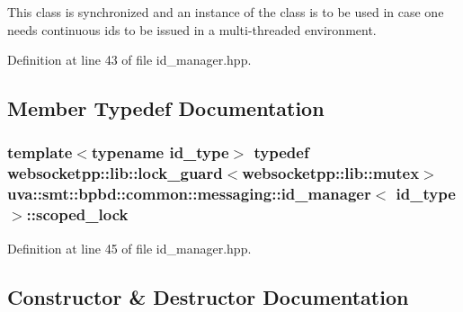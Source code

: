 This class is synchronized and an instance of the class is to be used in case one needs continuous ids to be issued in a multi-\/threaded environment. 

Definition at line 43 of file id\+\_\+manager.\+hpp.



\subsection{Member Typedef Documentation}
\hypertarget{classuva_1_1smt_1_1bpbd_1_1common_1_1messaging_1_1id__manager_aafd78a96c08b99a2d2ad36d75cfcb7e9}{}
\subsubsection[{scoped\+\_\+lock}]{\setlength{\rightskip}{0pt plus 5cm}template$<$typename id\+\_\+type$>$ typedef websocketpp\+::lib\+::lock\+\_\+guard$<$websocketpp\+::lib\+::mutex$>$ {\bf uva\+::smt\+::bpbd\+::common\+::messaging\+::id\+\_\+manager}$<$ id\+\_\+type $>$\+::{\bf scoped\+\_\+lock}}\label{classuva_1_1smt_1_1bpbd_1_1common_1_1messaging_1_1id__manager_aafd78a96c08b99a2d2ad36d75cfcb7e9}


Definition at line 45 of file id\+\_\+manager.\+hpp.



\subsection{Constructor \& Destructor Documentation}
\hypertarget{classuva_1_1smt_1_1bpbd_1_1common_1_1messaging_1_1id__manager_a393d90137186010617fe08c58a800c87}{}
